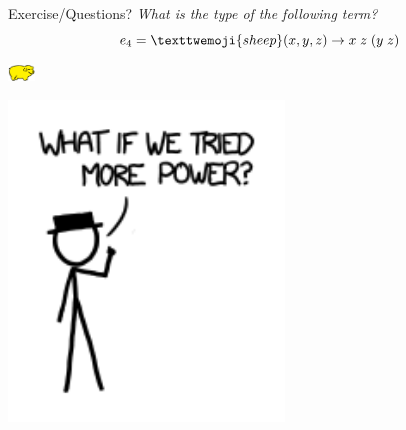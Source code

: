 \documentclass{beamer}
\newcommand{\lamb}{\texttwemoji{sheep}}
\begin{document}
\begin{frame}{Exercise/Questions?}
  \emph{What is the type of the following term?}
\[
  e_4 = \lamb(x, y, z) \to x \; z \; (y \; z)
\] 
\end{frame}

\begin{frame}{\includegraphics[width=20pt]{yellowPig.png}}
 \begin{center}
   \includegraphics[width=0.55\textwidth]{more_power.png} 
 \end{center} 
\end{frame}
\end{document}
